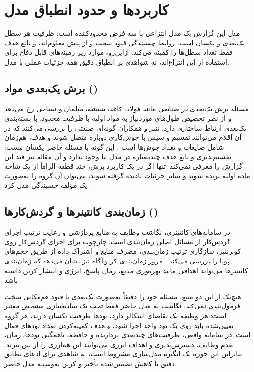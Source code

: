 \section{کاربردها و حدود انطباق مدل}

مدل این گزارش یک مدل انتزاعی با سه فرض محدودکننده است: ظرفیت هر سطل یک‌بعدی و یکسان است، روابط چسبندگی قیود سخت و از پیش معلوم‌اند، و تابع هدف فقط تعداد سطل‌ها را کمینه می‌کند. ازاین‌رو، موارد زیر زمینه‌های قابل دفاع برای استفاده از این انتزاع‌اند، نه شواهدی بر انطباق دقیق همه جزئیات عملی با مدل.

\subsection{برش یک‌بعدی مواد ()}\label{subsec:lr_cutting_stock}
مسئله برش یک‌بعدی در صنایعی مانند فولاد، کاغذ، شیشه، مبلمان و نساجی رخ می‌دهد و از نظر تخصیص طول‌های موردنیاز به مواد اولیه با ظرفیت محدود، با بسته‌بندی یک‌بعدی ارتباط ساختاری دارد. تنیر و همکاران گونه‌ای صنعتی را بررسی می‌کنند که در آن اقلام می‌توانند تقسیم و سپس با جوش‌کاری دوباره متصل شوند و هدف، هم‌زمان شامل ضایعات و تعداد جوش‌ها است \cite{D1_Tanir2016}. این گونه با مسئله حاضر یکسان نیست: تقسیم‌پذیری و تابع هدف چندمعیاره در مدل ما وجود ندارد و آن مقاله نیز قید  این گزارش را معرفی نمی‌کند. تنها اگر در یک کاربرد برش، چند قطعه الزاماً از یک شاخه ماده اولیه بریده شوند و سایر جزئیات نادیده گرفته شوند، می‌توان آن گروه را به‌صورت یک مؤلفه چسبندگی مدل کرد.

\subsection{زمان‌بندی کانتینرها و گردش‌کارها ()}\label{subsec:lr_cloud_orchestration}
در سامانه‌های کانتینری، نگاشت وظایف به منابع پردازشی و رعایت ترتیب اجرای گردش‌کار از مسائل اصلی زمان‌بندی است. چارچوب  برای اجرای گردش‌کار روی کوبرنتیز، سازگاری ترتیب زمان‌بندی، مصرف منابع و اشتراک داده از طریق حجم‌های پویا را بررسی می‌کند \cite{C1_Shan2022}. مرور زمان‌بندی کربن‌آگاه نیز نشان می‌دهد که زمان‌بندی کانتینرها می‌تواند اهدافی مانند بهره‌وری منابع، زمان پاسخ، انرژی و انتشار کربن داشته باشد \cite{C4_Yang2025}.

هیچ‌یک از این دو منبع، مسئله خود را دقیقاً به‌صورت  یک‌بعدی با قیود هم‌مکانی سخت فرمول‌بندی نمی‌کند. نگاشت به مدل حاضر فقط تحت یک ساده‌سازی مشخص معتبر است: هر وظیفه یک تقاضای اسکالر دارد، نودها ظرفیت یکسان دارند، هر گروه تعیین‌شده باید روی یک نود واحد اجرا شود، و هدف کمینه‌کردن تعداد نودهای فعال است. در سامانه واقعی، ظرفیت‌های چندبعدی پردازنده و حافظه، ناهمگنی نودها، زمان، تقدم وظایف، دسترس‌پذیری و اهداف انرژی می‌توانند این هم‌ارزی را از بین ببرند. بنابراین این حوزه یک انگیزه مدل‌سازی مشروط است، نه شاهدی برای ادعای تطابق دقیق یا کاهش تضمین‌شده تأخیر و کربن به‌وسیله مدل حاضر.
